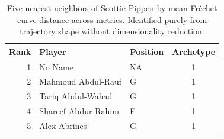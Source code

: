 \begin{table}[htbp]
  \centering\small
  \begin{tabular}{rllc}
    \toprule
    Rank & Player & Position & Archetype \\
    \midrule
    1 & No Name & NA & 1 \\
    2 & Mahmoud Abdul-Rauf & G & 1 \\
    3 & Tariq Abdul-Wahad & G & 1 \\
    4 & Shareef Abdur-Rahim & F & 1 \\
    5 & Alex Abrines & G & 1 \\
    \bottomrule
  \end{tabular}
  \caption{Five nearest neighbors of Scottie Pippen by mean Fr\'{e}chet curve distance across metrics. Identified purely from trajectory shape without dimensionality reduction.}
\end{table}

